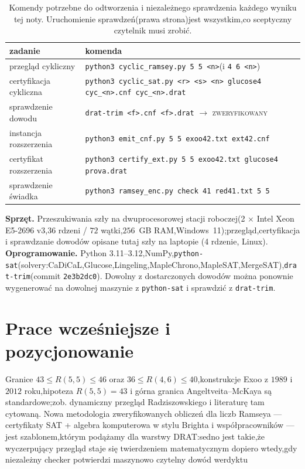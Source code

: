 \documentclass[11pt]{article}
\theoremstyle{definition}
\theoremstyle{plain}
\newcommand{\R}[2]{\ensuremath{R(#1,#2)}}
\begin{document}
\begin{table}[ht]\centering\small
\begin{tabular}{ll}
\toprule
zadanie & komenda \\
\midrule
przegląd cykliczny& \texttt{python3 cyclic\_ramsey.py 5 5 <n>}(i \texttt{4 6 <n>}) \\
certyfikacja cykliczna& \texttt{python3 cyclic\_sat.py <r> <s> <n> glucose4 cyc\_<n>.cnf cyc\_<n>.drat} \\
sprawdzenie dowodu& \texttt{drat-trim <f>.cnf <f>.drat} $\to$ \textsc{zweryfikowany} \\
instancja rozszerzenia& \texttt{python3 emit\_cnf.py 5 5 exoo42.txt ext42.cnf} \\
certyfikat rozszerzenia& \texttt{python3 certify\_ext.py  5 5 exoo42.txt glucose4 prova.drat} \\
sprawdzenie świadka& \texttt{python3 ramsey\_enc.py check 41 red41.txt 5 5} \\
\bottomrule
\end{tabular}
\caption{Komendy potrzebne do odtworzenia i niezależnego sprawdzenia każdego wyniku tej noty. Uruchomienie sprawdzeń(prawa strona)jest wszystkim,co sceptyczny czytelnik musi zrobić.}\label{tab:cmd}
\end{table}


\textbf{Sprzęt.} Przeszukiwania szły na dwuprocesorowej stacji roboczej(2 $\times$ Intel Xeon E5-2696 v3,$36$ rdzeni / $72$ wątki,$256$~GB RAM,Windows~11);przegląd,certyfikacja i sprawdzanie dowodów opisane tutaj szły na laptopie (4 rdzenie, Linux). \textbf{Oprogramowanie.} Python 3.11--3.12,NumPy,\texttt{python-sat}(solvery:CaDiCaL,Glucose,Lingeling,MapleChrono,MapleSAT,MergeSAT),\texttt{drat-trim}(commit \texttt{2e3b2dc0}). Dowolny z dostarczonych dowodów można ponownie wygenerować na dowolnej maszynie z \texttt{python-sat} i sprawdzić z \texttt{drat-trim}.

\section{Prace wcześniejsze i pozycjonowanie}\label{sec:prior}

Granice $43 \le \R{5}{5} \le 46$ oraz $36 \le \R{4}{6} \le 40$,konstrukcje Exoo z $1989$ i $2012$ roku,hipoteza $\R{5}{5} = 43$ i górna granica Angeltveita--McKaya są standardowe;zob. dynamiczny przegląd Radziszowskiego i literaturę tam cytowaną. Nowa metodologia zweryfikowanych obliczeń dla liczb Ramseya --- certyfikaty SAT + algebra komputerowa w stylu Brighta i współpracowników --- jest szablonem,którym podążamy dla warstwy DRAT:sedno jest takie,że wyczerpujący przegląd staje się twierdzeniem matematycznym dopiero wtedy,gdy niezależny checker potwierdzi maszynowo czytelny dowód werdyktu
\end{document}
